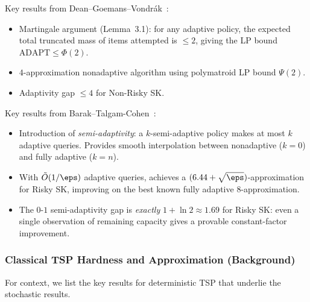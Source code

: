 \begin{remark}
    Key results from Dean--Goemans--Vondr\'{a}k~\cite{DeanGoemansVondrak2008}:
    \begin{itemize}
        \item Martingale argument (Lemma~3.1): for any adaptive policy, the expected total truncated mass of items attempted is $\le 2$, giving the LP bound $\text{ADAPT} \le \Phi(2)$.
        \item $4$-approximation nonadaptive algorithm using polymatroid LP bound $\Psi(2)$.
        \item Adaptivity gap $\le 4$ for Non-Risky SK.
    \end{itemize}

    Key results from Barak--Talgam-Cohen~\cite{BarakTalgamCohen2026}:
    \begin{itemize}
        \item Introduction of \emph{semi-adaptivity}: a $k$-semi-adaptive policy makes at most $k$ adaptive queries. Provides smooth interpolation between nonadaptive ($k=0$) and fully adaptive ($k=n$).
        \item With $\tilde{O}(1/\eps)$ adaptive queries, achieves a $(6.44 + \sqrt{\eps})$-approximation for Risky SK, improving on the best known fully adaptive $8$-approximation.
        \item The $0$-$1$ semi-adaptivity gap is \emph{exactly} $1 + \ln 2 \approx 1.69$ for Risky SK: even a single observation of remaining capacity gives a provable constant-factor improvement.
    \end{itemize}
\end{remark}

\subsubsection{Classical TSP Hardness and Approximation (Background)}

For context, we list the key results for deterministic TSP that underlie the stochastic results.

\begin{center}
\renewcommand{\arraystretch}{1.4}
\end{center}


